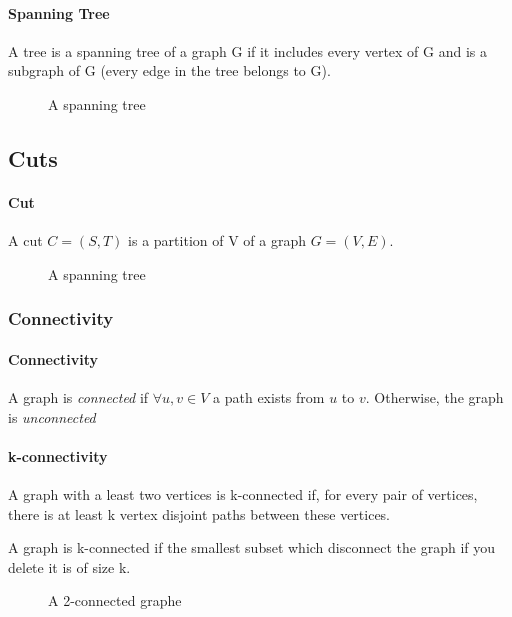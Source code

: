 \paragraph{Spanning Tree}
A tree is a spanning tree of a graph G if it includes every vertex of G and is a subgraph of G (every edge in the tree belongs to G).

\begin{figure}[!h]
  \begin{center}
    
  \end{center}
  \caption{A spanning tree}
\end{figure}


\subsection{Cuts}
\paragraph{Cut}A cut $C=(S,T)$ is a partition of V of a graph $G=(V,E)$.

\begin{figure}[!h]
  \begin{center}
    
  \end{center}
  \caption{A spanning tree}
\end{figure}


\subsubsection{Connectivity}
\paragraph{Connectivity}
A graph  is {\em connected} if $\forall u,v \in V$ a path exists from $u$
to $v$. Otherwise, the graph is {\em unconnected}

\paragraph{k-connectivity}
A graph with a least two vertices is k-connected if, for every pair of vertices, there is at least k vertex disjoint paths between these vertices.

A graph is k-connected if the smallest subset which disconnect the graph if you delete it is of size k.

\begin{figure}[!h]
  \begin{center}
    
  \end{center}
  \caption{A 2-connected graphe}
\end{figure}



